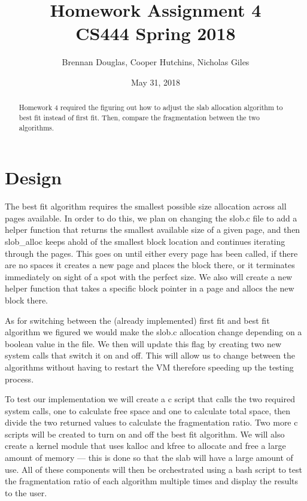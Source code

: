 \documentclass[onecolumn, draftclsnofoot,10pt, compsoc]{IEEEtran}
\title{Homework Assignment 4\\\large CS444 Spring 2018}
\author{Brennan Douglas, Cooper Hutchins, Nicholas Giles}
\date{May 31, 2018}
\begin{document}
\begin{titlingpage}
			\maketitle
      \begin{abstract}
			\noindent Homework 4 required the figuring out how to adjust the slab allocation algorithm to best fit instead of first fit.  Then, compare the fragmentation between the two algorithms.
      \end{abstract}
\end{titlingpage}

\newpage
{}

\clearpage
\singlespace

\section{Design} 
The best fit algorithm requires the smallest possible size allocation across all pages available. \cite{youtube_2016} In order to do this, we plan on changing the slob.c file to add a helper function that returns the smallest available size of a given page, and then slob\_alloc keeps ahold of the smallest block location and continues iterating through the pages. This goes on until either every page has been called, if there are no spaces it creates a new page and places the block there, or it terminates immediately on sight of a spot with the perfect size.  We also will create a new helper function that takes a specific block pointer in a page and allocs the new block there.

As for switching between the (already implemented) first fit and best fit algorithm we figured we would make the slob.c allocation change depending on a boolean value in the file.  We then will update this flag by creating two new system calls that switch it on and off.  This will allow us to change between the algorithms without having to restart the VM therefore speeding up the testing process.

To test our implementation we will create a c script that calls the two required system calls, one to calculate free space and one to calculate total space, then divide the two returned values to calculate the fragmentation ratio.  Two more c scripts will be created to turn on and off the best fit algorithm.  We will also create a kernel module that uses kalloc and kfree to allocate and free a large amount of memory --- this is done so that the slab will have a large amount of use.  All of these components will then be orchestrated using a bash script to test the fragmentation ratio of each algorithm multiple times and display the results to the user.
\end{document}
